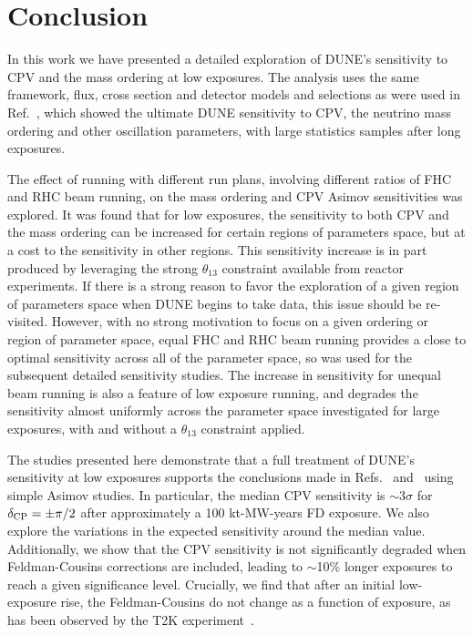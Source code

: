 \section{Conclusion}
\label{sec:conclude}

In this work we have presented a detailed exploration of DUNE's sensitivity to CPV and the mass ordering at low exposures. The analysis uses the same framework, flux, cross section and detector models and selections as were used in Ref.~\cite{Abi:2020qib}, which showed the ultimate DUNE sensitivity to CPV, the neutrino mass ordering and other oscillation parameters, with large statistics samples after long exposures.

The effect of running with different run plans, involving different ratios of FHC and RHC beam running, on the mass ordering and CPV Asimov sensitivities was explored. It was found that for low exposures, the sensitivity to both CPV and the mass ordering can be increased for certain regions of parameters space, but at a cost to the sensitivity in other regions. This sensitivity increase is in part produced by leveraging the strong $\theta_{13}$ constraint available from reactor experiments. If there is a strong reason to favor the exploration of a given region of parameters space when DUNE begins to take data, this issue should be re-visited. However, with no strong motivation to focus on a given ordering or region of \deltacp parameter space, equal FHC and RHC beam running provides a close to optimal sensitivity across all of the parameter space, so was used for the subsequent detailed sensitivity studies. The increase in sensitivity for unequal beam running is also a feature of low exposure running, and degrades the sensitivity almost uniformly across the parameter space investigated for large exposures, with and without a $\theta_{13}$ constraint applied.

The studies presented here demonstrate that a full treatment of DUNE's sensitivity at low exposures supports the conclusions made in Refs.~\cite{Abi:2020qib} and~\cite{Abi:2020evt} using simple Asimov studies. In particular, the median CPV sensitivity is $\sim$3$\sigma$ for $\delta_{\rm CP} = \pm\pi/2$ after approximately a 100 kt-MW-years FD exposure. We also explore the variations in the expected sensitivity around the median value. Additionally, we show that the CPV sensitivity is not significantly degraded when Feldman-Cousins corrections are included, leading to $\sim$10\% longer exposures to reach a given significance level. Crucially, we find that after an initial low-exposure rise, the Feldman-Cousins \dchisqcrit do not change as a function of exposure, as has been observed by the T2K experiment~\cite{Abe:2021gky}.

